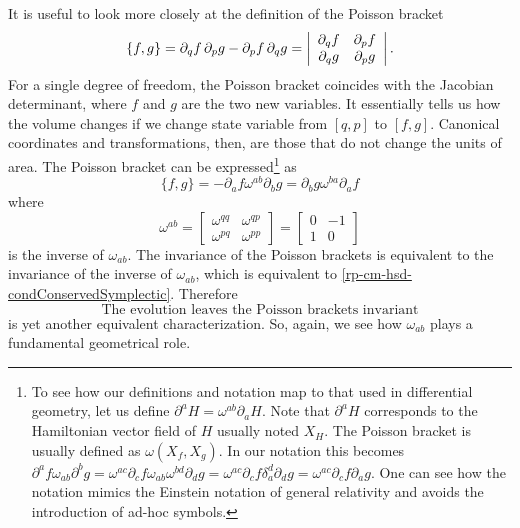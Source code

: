It is useful to look more closely at the definition of the Poisson bracket
\begin{equation}
	\{f, g\} = \partial_q f \, \partial_p g - \partial_p f \, \partial_q g = \left|\begin{array}{ c c }
		\partial_q f & \partial_p f \\
		\partial_q g & \partial_p g \\
	\end{array} \right|.
\end{equation}
For a single degree of freedom, the Poisson bracket coincides with the Jacobian determinant, where $f$ and $g$ are the two new variables. It essentially tells us how the volume changes if we change state variable from $[q, p]$ to $[f, g]$. Canonical coordinates and transformations, then, are those that do not change the units of area. The Poisson bracket can be expressed\footnote{To see how our definitions and notation map to that used in differential geometry, let us define $\partial^a H = \omega^{ab} \partial_a H$. Note that $\partial^a H$ corresponds to the Hamiltonian vector field of $H$ usually noted $X_H$. The Poisson bracket is usually defined as $\omega(X_f, X_g)$. In our notation this becomes $\partial^a f \omega_{ab} \partial^b g = \omega^{ac} \partial_c f \omega_{ab} \omega^{bd} \partial_d g = \omega^{ac} \partial_c f \delta_a^d \partial_d g = \omega^{ac} \partial_c f \partial_a g$. One can see how the notation mimics the Einstein notation of general relativity and avoids the introduction of ad-hoc symbols.} as
\begin{equation}
	\{f, g\} = - \partial_a f \omega^{ab} \partial_b g = \partial_b g \omega^{ba} \partial_a f
\end{equation}
where 
\begin{equation}
	\omega^{ab} = \left[\begin{array}{cc}
		\omega^{qq} & \omega^{qp} \\
		\omega^{pq} & \omega^{pp} 
	\end{array} \right]= \left[\begin{array}{cc}
		0 & -1 \\
		1 & 0 
	\end{array} \right]
\end{equation}
is the inverse of $\omega_{ab}$. The invariance of the Poisson brackets is equivalent to the invariance of the inverse of $\omega_{ab}$, which is equivalent to \ref{rp-cm-hsd-condConservedSymplectic}. Therefore
\begin{equation}\label{rp-cm-hsd-condConservedPoisson}
	\tag{HM-7}
	\text{The evolution leaves the Poisson brackets invariant}
\end{equation}
is yet another equivalent characterization. So, again, we see how $\omega_{ab}$ plays a fundamental geometrical role.


